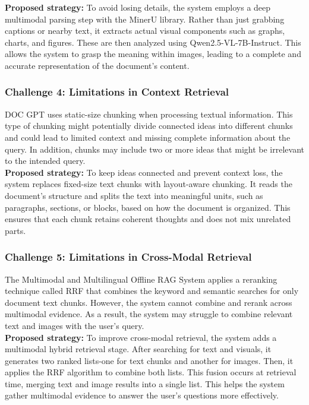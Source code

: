 \documentclass[11pt,a4paper]{report}
\begin{document}
\textbf{Proposed strategy:} To avoid losing details, the system employs a deep multimodal parsing step with the MinerU library. Rather than just grabbing captions or nearby text, it extracts actual visual components such as graphs, charts, and figures. These are then analyzed using Qwen2.5-VL-7B-Instruct. This allows the system to grasp the meaning within images, leading to a complete and accurate representation of the document's content.

\subsubsection{Challenge 4: Limitations in Context Retrieval}
DOC GPT \cite{R2026DOCGA} uses static-size chunking when processing textual information. This type of chunking might potentially divide connected ideas into different chunks and could lead to limited context and missing complete information about the query. In addition, chunks may include two or more ideas that might be irrelevant to the intended query.\\

\textbf{Proposed strategy:} To keep ideas connected and prevent context loss, the system replaces fixed-size text chunks with layout-aware chunking. It reads the document's structure and splits the text into meaningful units, such as paragraphs, sections, or blocks, based on how the document is organized. This ensures that each chunk retains coherent thoughts and does not mix unrelated parts.

\subsubsection{Challenge 5: Limitations in Cross-Modal Retrieval}
The Multimodal and Multilingual Offline \ac{RAG} System \cite{AlthafAhamed2026AMA} applies a reranking technique called RRF that combines the keyword and semantic searches for only document text chunks. However, the system cannot combine and rerank across multimodal evidence. As a result, the system may struggle to combine relevant text and images with the user’s query. \\

\textbf{Proposed strategy:} To improve cross-modal retrieval, the system adds a multimodal hybrid retrieval stage. After searching for text and visuals, it generates two ranked lists-one for text chunks and another for images. Then, it applies the \ac{RRF} algorithm to combine both lists. This fusion occurs at retrieval time, merging text and image results into a single list. This helps the system gather multimodal evidence to answer the user's questions more effectively.
\end{document}

